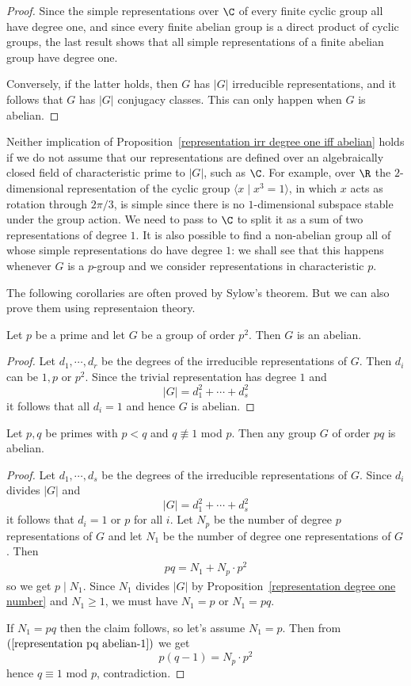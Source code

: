 \begin{proof}
Since the simple representations over $\C$ of every finite cyclic group all have degree one, and since every finite abelian group is a direct product of cyclic groups, the last result shows that all simple representations of a finite abelian group have degree one.\par
Conversely, if the latter holds, then $G$ has $|G|$ irreducible representations, and it follows that $G$ has $|G|$ conjugacy classes. This can only happen when $G$ is abelian.
\end{proof}
\begin{example}
Neither implication of Proposition~\ref{representation irr degree one iff abelian} holds if we do not assume that our representations are defined over an algebraically closed field of characteristic prime to $|G|$, such as $\C$. For example, over $\R$ the $2$-dimensional representation of the cyclic group $\langle x\mid x^3=1\rangle$, in which $x$ acts as rotation through $2\pi/3$, is simple since there is no $1$-dimensional subspace stable under the group action. We need to pass to $\C$ to split it as a sum of two representations of degree $1$. It is also possible to find a non-abelian group all of whose simple representations do have degree $1$: we shall see that this happens whenever $G$ is a $p$-group and we consider
representations in characteristic $p$.
\end{example}
The following corollaries are often proved by Sylow's theorem. But we can also prove them using representaion theory.
\begin{corollary}\label{group order p^2 is abliean}
Let $p$ be a prime and let $G$ be a group of order $p^2$. Then $G$ is an abelian. 
\end{corollary}
\begin{proof}
Let $d_1,\cdots,d_r$ be the degrees of the irreducible representations of $G$. Then $d_i$ can be $1,p$ or $p^2$. Since the trivial representation has degree $1$ and
\[|G|=d_1^2+\cdots+d_s^2\]
it follows that all $d_i=1$ and hence $G$ is abelian.
\end{proof}
\begin{corollary}\label{representation pq abelian}
Let $p,q$ be primes with $p<q$ and $q\not\equiv1$ mod $p$. Then any group $G$ of order $pq$ is abelian.
\end{corollary}
\begin{proof}
Let $d_1,\cdots,d_s$ be the degrees of the irreducible representations of $G$. Since $d_i$ divides $|G|$ and
\[|G|=d_1^2+\cdots+d_s^2\]
it follows that $d_i=1$ or $p$ for all $i$. Let $N_p$ be the number of degree $p$ representations of $G$ and let $N_1$ be the number of degree one representations of $G$. Then 
\begin{align}\label{representation pq abelian-1}
pq=N_1+N_p\cdot p^2
\end{align}
so we get $p\mid N_1$. Since $N_1$ divides $|G|$ by Proposition~\ref{representation degree one number} and $N_1\geq 1$, we must have $N_1=p$ or $N_1=pq$.\par 
If $N_1=pq$ then the claim follows, so let's assume $N_1=p$. Then from $(\ref{representation pq abelian-1})$ we get
\[p(q-1)=N_p\cdot p^2\]
hence $q\equiv 1$ mod $p$, contradiction.
\end{proof}
